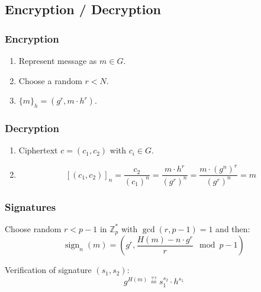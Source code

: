 \documentclass{article}
\newcommand{\ZZ}{\mathbb{Z}}
\newcommand{\Z}{\ZZ}
\begin{document}
\subsection{Encryption / Decryption}
\subsubsection{Encryption}

\begin{enumerate}
  \item Represent message as $m \in G$.
  \item Choose a random $r < N$.
  \item $\{m\}_h = (g^r, m \cdot h^r)$.
\end{enumerate}

\subsubsection{Decryption}
\begin{enumerate}
  \item Ciphertext $c = (c_1,c_2)$ with $c_i \in G$.
  \item \[
      [(c_1, c_2)]_n = \frac{c_2}{(c_1)^n} = \frac{m \cdot h^r}{(g^r)^n} = \frac{m \cdot (g^n)^r}{(g^r)^n} = m
    \]
\end{enumerate}


\subsubsection{Signatures}

Choose random $r < p-1$ in $\Z^*_p$ with $\gcd(r,p-1) = 1$ and then:
\[
  \operatorname{sign}_n(m) = \left( g^r, \frac{H(m) - n \cdot g^r}{r} \mod p-1 \right)
\]

Verification of signature $(s_1, s_2)$:
\[
  g^{H(m)} \overset{??}{=} s_1^{s_2} \cdot h^{s_1}
\]
\end{document}
